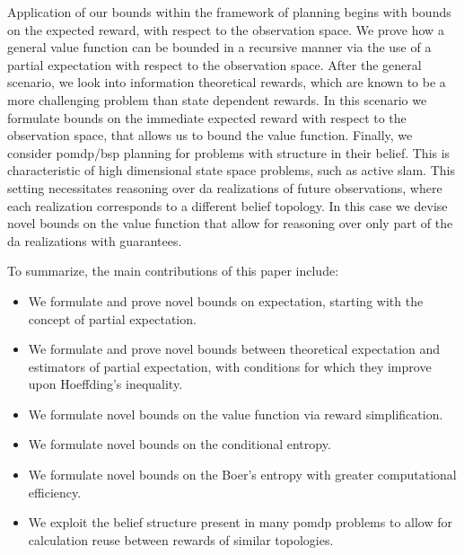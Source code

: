 Application of our bounds within the framework of planning begins with bounds on the expected reward, with respect to the observation space. We prove how a general value function can be bounded in a recursive manner via the use of a partial expectation with respect to the observation space. After the general scenario, we look into information theoretical rewards, which are known to be a more challenging problem than state dependent rewards. In this scenario we formulate bounds on the immediate expected reward with respect to the observation space, that allows us to bound the value function. Finally, we consider \gls{pomdp}/\gls{bsp} planning for problems with structure in their belief. This is characteristic of high dimensional state space problems, such as active \gls{slam}. This setting necessitates reasoning over \gls{da} realizations of future observations, where each realization corresponds to a different belief topology. In this case we devise novel bounds on the value function that allow for reasoning over only part of the \gls{da} realizations with guarantees.

To summarize, the main contributions of this paper include:
\begin{itemize}
	\item We formulate and prove novel bounds on expectation, starting with the concept of partial expectation.
	\item We formulate and prove novel bounds between theoretical expectation and estimators of partial expectation, with conditions for which they improve upon Hoeffding's inequality.
	\item We formulate novel bounds on the value function via reward simplification.
	\item We formulate novel bounds on the conditional entropy.
	\item We formulate novel bounds on the Boer's entropy with greater computational efficiency.
	\item We exploit the belief structure present in many \gls{pomdp} problems to allow for calculation reuse between rewards of similar topologies.
\end{itemize}
